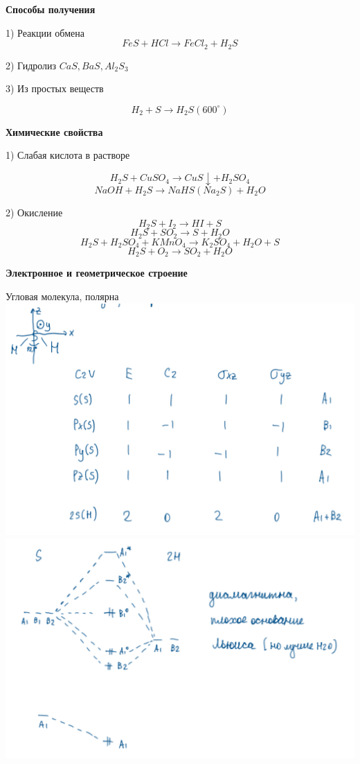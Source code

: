 \documentclass[14pt,a4paper]{scrartcl}
\begin{document}
\textbf{Способы получения}

1) Реакции обмена
$$FeS + HCl \rightarrow FeCl_2 + H_2S$$

2) Гидролиз $CaS, BaS, Al_2S_3$

3) Из простых веществ

$$H_2 + S \rightarrow H_2S(600^{\circ})$$

\textbf{Химические свойства}

1) Слабая кислота в растворе

$$H_2S + CuSO_4 \rightarrow CuS\downarrow + H_2SO_4$$
$$NaOH + H_2S \rightarrow NaHS (Na_2S) + H_2O$$

2) Окисление $$H_2S + I_2 \rightarrow HI + S$$
$$H_2S + SO_2 \rightarrow S+ H_2O$$
$$H_2S + H_2SO_4 + KMnO_4 \rightarrow K_2SO_4 + H_2O + S$$
$$H_2S + O_2 \rightarrow SO_2 + H_2O$$

\textbf{Электронное и геометрическое строение}

Угловая молекула, полярна\\
\includegraphics{6v4.png}
\includegraphics{6v5.png}
\end{document}
